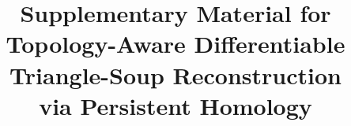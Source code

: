 \documentclass[10pt,twocolumn,letterpaper]{article}
\title{Supplementary Material for\\
       Topology-Aware Differentiable Triangle-Soup Reconstruction\\
       via Persistent Homology}
\author{}
\begin{document}
\maketitle

\appendix
\renewcommand{\thetable}{S\arabic{table}}
\renewcommand{\thefigure}{S\arabic{figure}}










\clearpage  %
{
  \small
  
  
}
\end{document}
